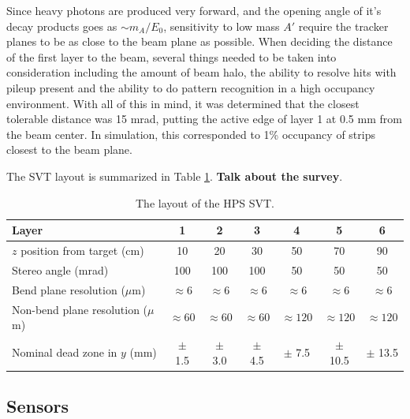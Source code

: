 Since heavy photons are produced very forward, and the opening angle of it's 
decay products goes as $\sim m_{A}/E_{0}$, sensitivity to low mass $A'$ require
the tracker planes to be as close to the beam plane as possible.  When deciding
the distance of the first layer to the beam, several things  needed to be taken
into consideration including the amount of beam halo, the ability to resolve 
hits with pileup present and the ability to do pattern recognition in a high 
occupancy environment.  With all of this in mind, it was determined that the 
closest tolerable distance was 15 mrad, putting the active edge of layer 1 
at 0.5 mm from the beam center. In simulation, this corresponded to 1\% occupancy
of strips closest to the beam plane.

The SVT layout is summarized in Table \ref{tab:svt_layout}. \textbf{Talk about
the survey}.

\begin{table}[t]
 \begin{center}
\begin{tabular}{l|cccccc}  
\hline
Layer & 1 & 2 & 3 & 4 & 5 & 6 \\ \hline
$z$ position from target (cm)    & 10 & 20 & 30 & 50 & 70 & 90 \\
Stereo angle (mrad) & 100 & 100 & 100 & 50 & 50 & 50 \\
Bend plane resolution ($\mu$m) & $\approx$6 & $\approx$6 & $\approx$6 & $\approx$6 & $\approx$6 & $\approx$6 \\
Non-bend plane resolution ($\mu$m) & $\approx60$ & $\approx60$ & $\approx60$ & $\approx120$ & $\approx120$ & $\approx120$ \\
Nominal dead zone in $y$ (mm) & $\pm$ 1.5 & $\pm$ 3.0 & $\pm$ 4.5 & $\pm$ 7.5 & $\pm$ 10.5 & $\pm$ 13.5 \\ 
\hline
\end{tabular}
\caption{The layout of the HPS SVT.}
\label{tab:svt_layout}
\end{center}
\end{table}

\subsection{Sensors}


